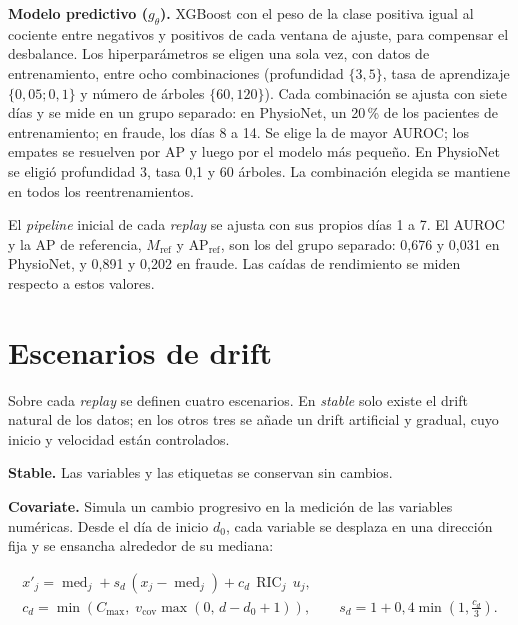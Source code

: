 \textbf{Modelo predictivo ($g_\theta$).} XGBoost \cite{chen2016xgboost} con el peso de la clase
positiva igual al cociente entre negativos y positivos de cada ventana de ajuste, para compensar
el desbalance. Los hiperparámetros se eligen una sola vez, con datos de entrenamiento, entre ocho
combinaciones (profundidad $\{3, 5\}$, tasa de aprendizaje $\{0{,}05; 0{,}1\}$ y número de
árboles $\{60, 120\}$). Cada combinación se ajusta con siete días y se mide en un grupo separado:
en PhysioNet, un 20\,\% de los pacientes de entrenamiento; en fraude, los días 8 a 14. Se elige
la de mayor AUROC; los empates se resuelven por AP y luego por el modelo más pequeño. En
PhysioNet se eligió profundidad 3, tasa 0,1 y 60 árboles. La combinación elegida se mantiene en
todos los reentrenamientos.

El \textit{pipeline} inicial de cada \textit{replay} se ajusta con sus propios días 1 a 7. El
AUROC y la AP de referencia, $M_{\text{ref}}$ y $\text{AP}_{\text{ref}}$, son los del grupo
separado: 0,676 y 0,031 en PhysioNet, y 0,891 y 0,202 en fraude. Las caídas de rendimiento se
miden respecto a estos valores.

\section{Escenarios de drift}
\label{sec:met_drift}

Sobre cada \textit{replay} se definen cuatro escenarios. En \textit{stable} solo existe el drift
natural de los datos; en los otros tres se añade un drift artificial y gradual, cuyo inicio y
velocidad están controlados.

\textbf{Stable.} Las variables y las etiquetas se conservan sin cambios.

\textbf{Covariate.} Simula un cambio progresivo en la medición de las variables numéricas. Desde
el día de inicio $d_0$, cada variable se desplaza en una dirección fija y se ensancha alrededor
de su mediana:

\begin{equation}
    \begin{gathered}
    x'_{j} = \operatorname{med}_j + s_d\,(x_j - \operatorname{med}_j) + c_d\,\operatorname{RIC}_j\,u_j, \\
    c_d = \min\!\left(C_{\max},\; v_{\text{cov}} \max(0,\, d - d_0 + 1)\right),
    \qquad
    s_d = 1 + 0{,}4 \min\!\left(1, \tfrac{c_d}{3}\right).
    \end{gathered}
    \label{eq:covariate_injection}
\end{equation}

